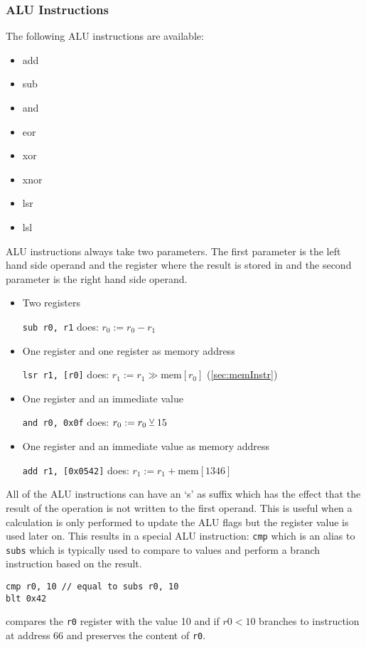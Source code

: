 \subsubsection{\gls{ALU} Instructions}
The following \gls{ALU} instructions are available:
\begin{multicols}{4}
  \begin{itemize}
    \item add
    \item sub
    \item and
    \item eor
    \item xor
    \item xnor
    \item lsr
    \item lsl
  \end{itemize}
\end{multicols}
\gls{ALU} instructions always take two parameters. The first parameter is the left hand side operand and the register where the result is stored in and the second parameter is the right hand side operand.
\begin{itemize}
  \item Two registers

        \qquad\texttt{sub r0, r1} does: $r_0:=r_0-r_1$
  \item One register and one register as memory address

        \qquad\texttt{lsr r1, [r0]} does: $r_1:=r_1\gg\text{mem}[r_0]$ (\cref{sec:memInstr})
  \item One register and an immediate value

        \qquad\texttt{and r0, 0x0f} does: $r_0:=r_0\veebar 15$
  \item One register and an immediate value as memory address

        \qquad\texttt{add r1, [0x0542]} does: $r_1:=r_1+\text{mem}[1346]$
\end{itemize}
All of the \gls{ALU} instructions can have an `s' as suffix which has the effect that the result of the operation is not written to the first operand.
This is useful when a calculation is only performed to update the \gls{ALU} flags but the register value is used later on.
This results in a special \gls{ALU} instruction: \texttt{cmp} which is an alias to \texttt{subs} which is typically used to compare to values and perform a branch instruction based on the result.
\begin{verbatim}
cmp r0, 10 // equal to subs r0, 10
blt 0x42
\end{verbatim}
compares the \texttt{r0} register with the value 10 and if $r0 < 10$ branches to instruction at address 66 and preserves the content of \texttt{r0}.

